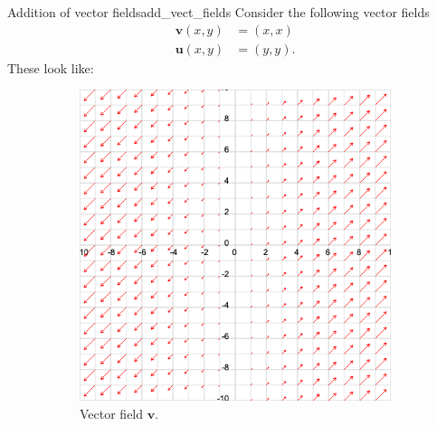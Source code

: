         \begin{ex}{Addition of vector fields}{add_vect_fields}
        Consider the following vector fields
        \begin{align*}
            \mathbf{v}(x,y)&=(x,x)\\
            \mathbf{u}(x,y)&=(y,y).
        \end{align*}
        These look like:
        \begin{figure}[H]
            \centering
            \begin{subfigure}[h]{.45\textwidth}
            \includegraphics[width=\textwidth]{Figures/vec_v.png}
            \caption{Vector field $\mathbf{v}$.}
            \end{subfigure}
            ~
            \begin{subfigure}[h]{.45\textwidth}

\end{subfigure}
\end{figure}
\end{ex}
